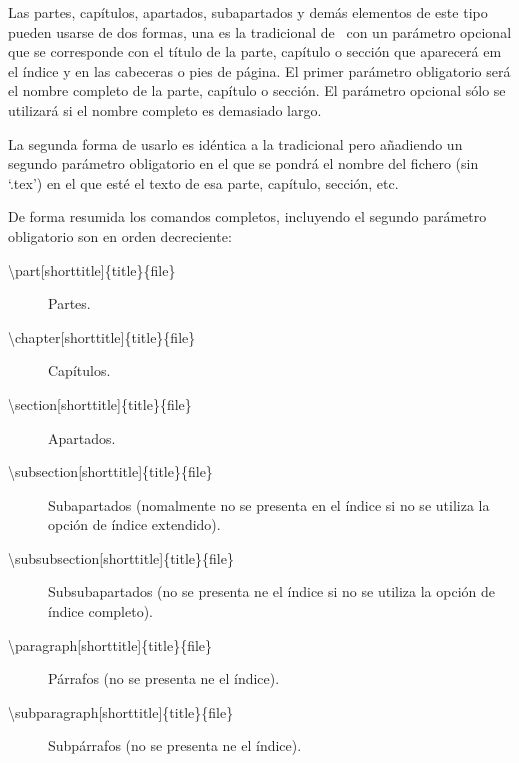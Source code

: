 Las partes, capítulos, apartados, subapartados y demás elementos de este tipo pueden usarse de dos formas, una es la tradicional de \LaTeXe\ con un parámetro opcional que se corresponde con el título de la parte, capítulo o sección que aparecerá em el índice y en las cabeceras o pies de página. El primer parámetro obligatorio será el nombre completo de la parte, capítulo o sección. El parámetro opcional sólo se utilizará si el nombre completo es demasiado largo.

La segunda forma de usarlo es idéntica a la tradicional pero añadiendo un segundo parámetro obligatorio en el que se pondrá el nombre del fichero (sin `.tex') en el que esté el texto de esa parte, capítulo, sección, etc.

De forma resumida los comandos completos, incluyendo el segundo parámetro obligatorio son en orden decreciente:

\begin{description}
  \item [\textbackslash part[shorttitle{]}\{title\}\{file\}] Partes.
  \item [\textbackslash chapter[shorttitle{]}\{title\}\{file\}] Capítulos.
  \item [\textbackslash section[shorttitle{]}\{title\}\{file\}] Apartados.
  \item [\textbackslash subsection[shorttitle{]}\{title\}\{file\}] Subapartados (nomalmente no se presenta en el índice si no se utiliza la opción de índice extendido).
  \item [\textbackslash subsubsection[shorttitle{]}\{title\}\{file\}] Subsubapartados (no se presenta ne el índice si no se utiliza la opción de índice completo).
  \item [\textbackslash paragraph[shorttitle{]}\{title\}\{file\}] Párrafos (no se presenta ne el índice).
  \item [\textbackslash subparagraph[shorttitle{]}\{title\}\{file\}] Subpárrafos (no se presenta ne el índice).
\end{description}
